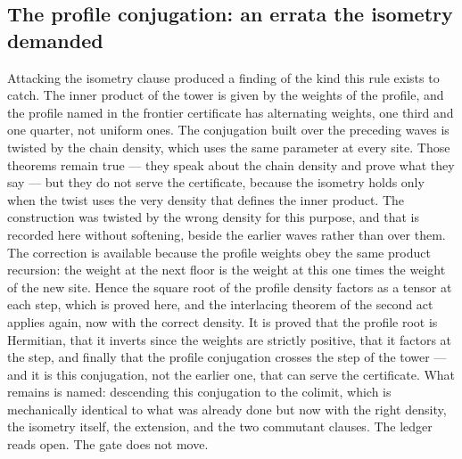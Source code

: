 \documentclass[11pt]{article}
\theoremstyle{definition}\newtheorem{deriv}{Derivation}
\begin{document}
\subsection*{The profile conjugation: an errata the isometry demanded}Attacking the isometry clause produced a finding of the kind this rule exists to catch. The inner product of the tower is given by the weights of the profile, and the profile named in the frontier certificate has alternating weights, one third and one quarter, not uniform ones. The conjugation built over the preceding waves is twisted by the chain density, which uses the same parameter at every site. Those theorems remain true --- they speak about the chain density and prove what they say --- but they do not serve the certificate, because the isometry holds only when the twist uses the very density that defines the inner product. The construction was twisted by the wrong density for this purpose, and that is recorded here without softening, beside the earlier waves rather than over them. The correction is available because the profile weights obey the same product recursion: the weight at the next floor is the weight at this one times the weight of the new site. Hence the square root of the profile density factors as a tensor at each step, which is proved here, and the interlacing theorem of the second act applies again, now with the correct density. It is proved that the profile root is Hermitian, that it inverts since the weights are strictly positive, that it factors at the step, and finally that the profile conjugation crosses the step of the tower --- and it is this conjugation, not the earlier one, that can serve the certificate. What remains is named: descending this conjugation to the colimit, which is mechanically identical to what was already done but now with the right density, the isometry itself, the extension, and the two commutant clauses. The ledger reads open. The gate does not move.
\end{document}
